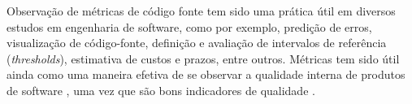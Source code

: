 %
%
%

Observação de métricas de código fonte tem sido uma prática útil em diversos
estudos em engenharia de software, como por exemplo, predição de erros,
visualização de código-fonte, definição e avaliação de intervalos de referência
({\it thresholds}), estimativa de custos e prazos, entre outros.  Métricas tem
sido útil ainda como uma maneira efetiva de se observar a qualidade interna de
produtos de software \cite{Meirelles2013}, uma vez que são bons indicadores de
qualidade \cite{Basili1996}.


